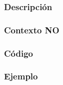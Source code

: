 \subsubsection{Descripci\'on} 
\subsubsection{Contexto NO} 
\subsubsection{C\'odigo} 

\subsubsection{Ejemplo} 